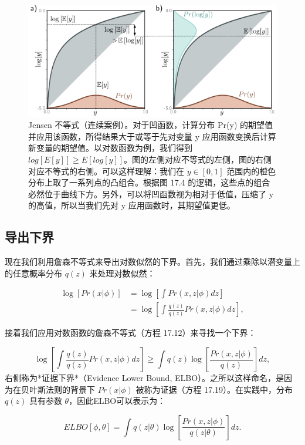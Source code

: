 \begin{figure}[ht!]
\centering
\includegraphics[width=0.7\linewidth]{png/chapter17/VAEJensen.png}
\caption{Jensen 不等式（连续案例）。对于凹函数，计算分布 Pr(y) 的期望值并应用该函数，所得结果大于或等于先对变量 y 应用函数变换后计算新变量的期望值。以对数函数为例，我们得到 \(log[E[y]] \geq E[log[y]]\)。图的左侧对应不等式的左侧，图的右侧对应不等式的右侧。可以这样理解：我们在 \(y \in [0, 1]\) 范围内的橙色分布上取了一系列点的凸组合。根据图 17.4 的逻辑，这些点的组合必然位于曲线下方。另外，可以将凹函数视为相对于低值，压缩了 y 的高值，所以当我们先对 y 应用函数时，其期望值更低。}
\end{figure}


\subsection{导出下界}

现在我们利用詹森不等式来导出对数似然的下界。首先，我们通过乘除以潜变量上的任意概率分布 \(q(z)\) 来处理对数似然：


\begin{align}
\log[Pr(x|\phi)] &= \log \left[ \int Pr(x, z|\phi) dz \right] \\
&= \log \left[ \int \frac{q(z)}{q(z)} Pr(x, z|\phi) dz \right], 
\end{align} 


接着我们应用对数函数的詹森不等式（方程 17.12）来寻找一个下界：

\begin{equation}
\log \left[ \int \frac{q(z)}{q(z)} Pr(x, z|\phi) dz \right] \geq \int q(z) \log \left[ \frac{Pr(x, z|\phi)}{q(z)} \right] dz, 
\end{equation}
右侧称为*证据下界*（Evidence Lower Bound, ELBO）。之所以这样命名，是因为在贝叶斯法则的背景下 \(Pr(x|\phi)\) 被称为证据（方程 17.19）。在实践中，分布 \(q(z)\) 具有参数 \(\theta\)，因此ELBO可以表示为：

\begin{equation}
ELBO[\phi, \theta] = \int q(z|\theta) \log \left[ \frac{Pr(x, z|\phi)}{q(z|\theta)} \right] dz. 
\end{equation}

